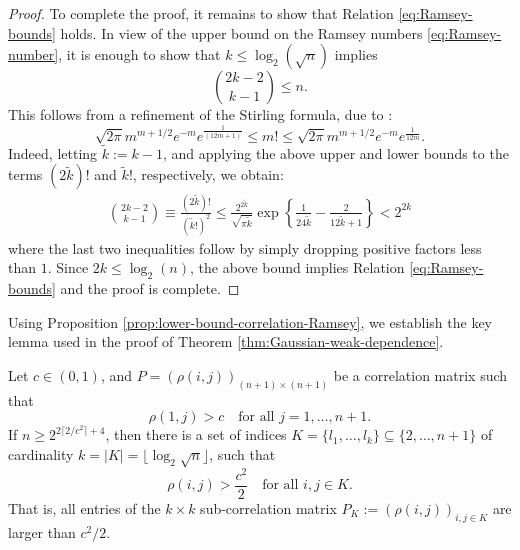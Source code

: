 \begin{proof}
To complete the proof, it remains to show that Relation \eqref{eq:Ramsey-bounds} holds.
In view of the upper bound on the Ramsey numbers \eqref{eq:Ramsey-number}, it 
is enough to show that $k \le \log_2(\sqrt{n})$ implies
$$
\binom{2k-2}{k-1} \le n.
$$
This follows from a refinement of the Stirling formula, due to \citet{robbins1955remark}:
$$
 \sqrt{2\pi} m^{m+1/2} e^{-m} e^{\frac{1}{(12 m +1)}} \le  m! \le \sqrt{2\pi} m^{m+1/2} e^{-m} 
 e^{\frac{1}{12 m}}.
$$
Indeed, letting $\widetilde k:= k-1$, and applying the above upper and lower bounds 
to the  terms $(2\widetilde k)!$ and $\widetilde k!$, respectively, we obtain:
\begin{align*}
\binom{2k-2}{k-1} \equiv \frac{(2\widetilde k)!}{ (\widetilde k!)^2 }
\le \frac{2^{2\widetilde k}}{\sqrt{\pi \widetilde k}}\exp\left \{ \frac{1}{24 \widetilde k} -
\frac{2}{ 12 \widetilde k +1}\right\} < 2^{2 k}
\end{align*}
where the last two inequalities follow by simply dropping positive factors less than $1$.
Since $2k \le \log_2(n)$, the above bound implies Relation \eqref{eq:Ramsey-bounds} 
and the proof is complete.
\end{proof}

Using Proposition \ref{prop:lower-bound-correlation-Ramsey}, we establish the key lemma used in the proof of Theorem \ref{thm:Gaussian-weak-dependence}.


\begin{lemma} \label{lemma:positive-correlation}
  Let $c\in(0,1)$, and $P = \left(\rho(i,j)\right)_{(n+1)\times(n+1)}$ be a correlation matrix such that \begin{equation} \label{eq:positive-correlation-lemma-condition}
      \rho(1,j) > c \quad \mbox{for all } j = 1,\ldots,n+1.
  \end{equation}
  If $n \ge 2^{2\lceil2/c^2\rceil+4}$, then there is a set of indices $K = \{l_1, \ldots, l_k\}\subseteq \{2,\ldots,n+1\}$ of cardinality $k = |K| = \lfloor\log_2{\sqrt{n}}\rfloor$, such that 
  \begin{equation} \label{eq:positive-correltation-lemma-conclusion}
      \rho(i,j) > \frac{c^2}{2} \quad\mbox{for all } i,j\in K.
  \end{equation}
  That is, all entries of the $k\times k$ sub-correlation matrix $P_K:=\left(\rho(i,j)\right)_{i,j\in K}$ are larger than $c^2/2$.
\end{lemma}


